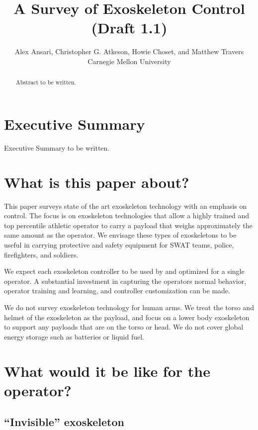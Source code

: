 \documentclass[letterpaper,12pt,fullpage]{article}
\begin{document}
\title{A Survey of Exoskeleton Control (Draft 1.1)}

\author{Alex Ansari, Christopher G. Atkeson, Howie Choset, and Matthew Travers\\
Carnegie Mellon University}

\maketitle

\begin{abstract}
Abstract to be written.
\end{abstract}

\section{Executive Summary}

Executive Summary to be written.

\section{What is this paper about?}

This paper surveys state of the art exoskeleton technology with an
emphasis on control. The focus is on exoskeleton technologies that allow a
highly trained and top percentile athletic 
operator to carry a payload that weighs approximately the same amount
as the operator. We envisage these types of exoskeletons to be useful
in carrying protective and safety equipment for SWAT teams, police,
firefighters, and soldiers. 

We expect each exoskeleton controller
to be used by and optimized for a single operator.
A substantial investment in capturing the operators normal behavior,
operator training and learning, and controller customization can be made.

We do not survey exoskeleton technology for human arms. 
We treat the torso and helmet of the exoskeleton as the payload,
and focus on a lower body exoskeleton to support any payloads that
are on the torso or head.
We do not cover global energy storage such as batteries or liquid fuel.

\section{What would it be like for the operator?}

\subsection{``Invisible'' exoskeleton}
\end{document}
